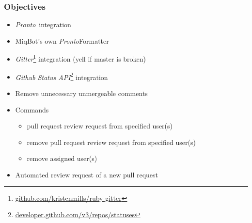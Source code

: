 \documentclass[10pt,xcolor=pdflatex]{beamer}
\begin{document}
\begin{frame}\frametitle{Objectives}
    \begin{itemize}
        \item \textit{Pronto}\footnotemark \ integration\\[0.5em]
        \item MiqBot's own \textit{Pronto}\footnotemark[\value{footnote}] Formatter\\[0.5em]


        \item \textit{Gitter}\footnote{\color{cyan}\href{https://github.com/kristenmills/ruby-gitter}{github.com/kristenmills/ruby-gitter}} integration (yell if master is broken)\\[0.5em]
        \item \textit{Github Status API}\footnote{\color{cyan}\href{https://developer.github.com/v3/repos/statuses}{developer.github.com/v3/repos/statuses}} integration\\[0.5em]
        \item Remove unnecessary unmergeable comments
        \item Commands\\
            \begin{itemize}
                \item pull request review request from specified user(s)
                \item remove pull request review request from specified user(s)
                \item remove assigned user(s)
            \end{itemize}
        \item Automated review request of a new pull request
    \end{itemize}
\end{frame}

\end{document}
